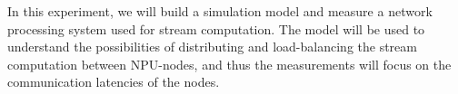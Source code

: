In this experiment, we will build a simulation model and measure a network processing system used for stream computation. The model will be used to understand the possibilities of distributing and load-balancing the stream computation between NPU-nodes, and thus the measurements will focus on the communication latencies of the nodes.

